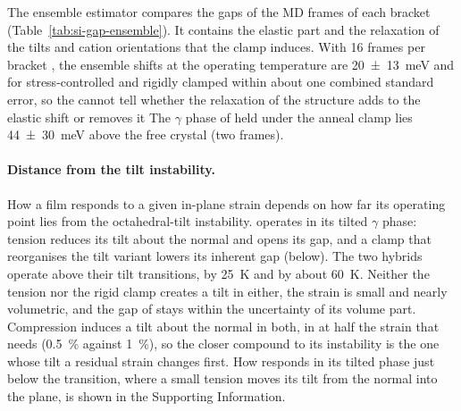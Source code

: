 {The ensemble estimator compares the gaps of the MD frames of each bracket (Table~\ref{tab:si-gap-ensemble}).
It contains the elastic part and the relaxation of the tilts and cation orientations that the
clamp induces. With 16 frames per bracket , the ensemble
shifts at the operating temperature are \SI{20 \pm 13}{meV} and  for
stress-controlled and rigidly clamped \CsSnI{} within about one combined standard error, so the 
cannot tell whether the relaxation of the structure adds to the elastic shift or removes it The
$\gamma$ phase of \CsSnI{} held under the anneal clamp lies \SI{44 \pm 30}{meV} above the free crystal (two
frames).

{\changedcolor
\paragraph{Distance from the tilt instability.}
How a film responds to a given in-plane strain depends on how far its operating point lies from the
octahedral-tilt instability. \CsSnI{} operates in its tilted $\gamma$ phase: tension reduces its tilt about
the normal and opens its gap, and a clamp that reorganises the tilt variant lowers its inherent gap
(below). The two hybrids operate above their tilt transitions, \MASnI{} by \SI{25}{K} and \FASnI{} by about
\SI{60}{K}. Neither the tension nor the rigid clamp creates a tilt in either, the strain is small and nearly
volumetric, and the gap of \FASnI{} stays within the uncertainty of its volume part. Compression induces a
tilt about the normal in both, in \MASnI{} at half the strain that \FASnI{} needs (\SI{0.5}{\percent}
against \SI{1}{\percent}), so the closer compound to its instability is the one whose tilt a residual
strain changes first. How \MASnI{} responds in its tilted phase just below the transition, where a small
tension moves its tilt from the normal into the plane, is shown in the Supporting Information.
}

}
